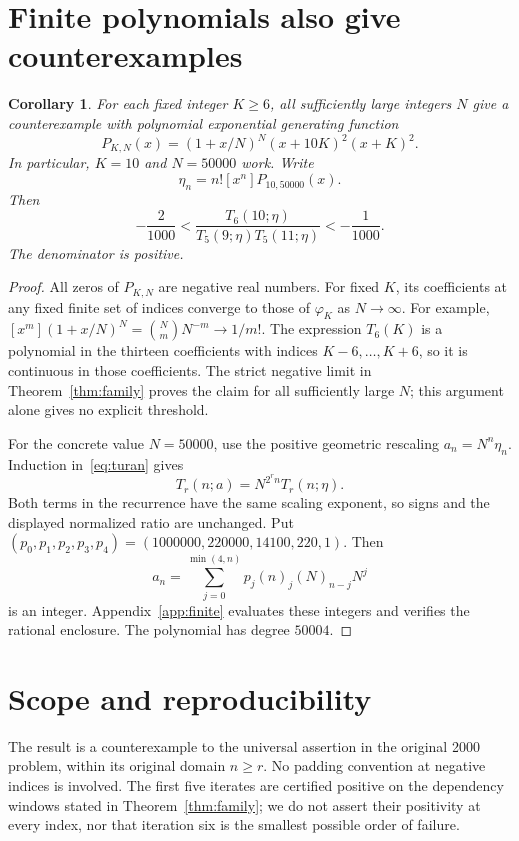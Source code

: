 \documentclass[11pt]{article}
\newtheorem{corollary}[theorem]{Corollary}
\begin{document}
\section{Finite polynomials also give counterexamples}
\begin{corollary}\label{cor:finite}
For each fixed integer $K\ge6$, all sufficiently large integers $N$ give a
counterexample with polynomial exponential generating function
\[
P_{K,N}(x)=(1+x/N)^N(x+10K)^2(x+K)^2.
\]
In particular, $K=10$ and $N=50000$ work. Write
\[\eta_n=n![x^n]P_{10,50000}(x).\]
Then
\[
\boxed{-\frac{2}{1000}
<\frac{T_6(10;\eta)}{T_5(9;\eta)T_5(11;\eta)}
<-\frac{1}{1000}.}
\]
The denominator is positive.
\end{corollary}
\begin{proof}
All zeros of $P_{K,N}$ are negative real numbers. For fixed $K$, its
coefficients at any fixed finite set of indices converge to those of
$\varphi_K$ as $N\to\infty$. For example,
$[x^m](1+x/N)^N=\binom Nm N^{-m}\to1/m!$.
The expression $T_6(K)$ is a polynomial in the thirteen coefficients with
indices $K-6,\ldots,K+6$, so it is continuous in those coefficients.
The strict negative limit in Theorem~\ref{thm:family} proves the claim for
all sufficiently large $N$; this argument alone gives no explicit threshold.

For the concrete value $N=50000$, use the positive geometric rescaling
$a_n=N^n\eta_n$. Induction in~\eqref{eq:turan} gives
\[
T_r(n;a)=N^{2^r n}T_r(n;\eta).
\]
Both terms in the recurrence have the same scaling exponent, so signs and
the displayed normalized ratio are unchanged. Put
$(p_0,p_1,p_2,p_3,p_4)=(1000000,220000,14100,220,1)$. Then
\[
a_n=\sum_{j=0}^{\min(4,n)}p_j(n)_j(N)_{n-j}N^j
\]
is an integer. Appendix~\ref{app:finite} evaluates these integers and
verifies the rational enclosure. The polynomial has degree $50004$.
\end{proof}

\section{Scope and reproducibility}
The result is a counterexample to the universal assertion in the original
2000 problem, within its original domain $n\ge r$. No padding convention
at negative indices is involved. The first five iterates are certified
positive on the dependency windows stated in Theorem~\ref{thm:family};
we do not assert their positivity at every index, nor that iteration six
is the smallest possible order of failure.
\end{document}
